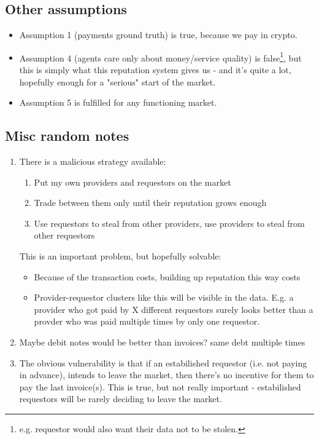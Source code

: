\documentclass{article}
\begin{document}
\subsection{Other assumptions}

\begin{itemize}

    \item Assumption 1 (payments ground truth) is true, because we pay in crypto.
    \item Assumption 4 (agents care only about money/service quality) is false\footnote{e.g. requestor would also want their data not to be stolen.}, but this is simply what this reputation system gives us - and it's quite a lot,
hopefully enough for a "serious" start of the market.
    \item Assumption 5 is fulfilled for any functioning market.
\end{itemize}

\subsection{Misc random notes}
\begin{enumerate}
    \item There is a malicious strategy available:
        \begin{enumerate}
            \item Put my own providers and requestors on the market
            \item Trade between them only until their reputation grows enough
            \item Use requestors to steal from other providers, use providers to steal from other requestors
        \end{enumerate}
        This is an important problem, but hopefully solvable:
        \begin{itemize}
            \item Because of the transaction costs, building up reputation this way costs
            \item Provider-requestor clusters like this will be visible in the data. E.g. a provider who got paid by X different requestors surely looks better than
                a provder who was paid multiple times by only one requestor.
        \end{itemize}
    \item Maybe debit notes would be better than invoices?
        same debt multiple times
    \item The obvious vulnerability is that if an estabilished requestor (i.e. not paying in advance), intends to leave the market, then there's no
        incentive for them to pay the last invoice(s). This is true, but not really important - estabilished requestors will be rarely deciding to leave the market.
\end{enumerate}
\end{document}
